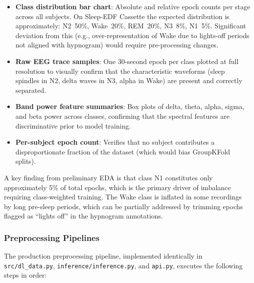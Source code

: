 \documentclass[10pt]{article}
\begin{document}
\begin{itemize}
  \item \textbf{Class distribution bar chart}: Absolute and relative epoch counts per stage across all subjects. On Sleep-EDF Cassette the expected distribution is approximately: N2~50\%, Wake~20\%, REM~20\%, N3~8\%, N1~5\%. Significant deviation from this (e.g., over-representation of Wake due to lights-off periods not aligned with hypnogram) would require pre-processing changes.
  \item \textbf{Raw EEG trace samples}: One 30-second epoch per class plotted at full resolution to visually confirm that the characteristic waveforms (sleep spindles in N2, delta waves in N3, alpha in Wake) are present and correctly separated.
  \item \textbf{Band power feature summaries}: Box plots of delta, theta, alpha, sigma, and beta power across classes, confirming that the spectral features are discriminative prior to model training.
  \item \textbf{Per-subject epoch count}: Verifies that no subject contributes a disproportionate fraction of the dataset (which would bias GroupKFold splits).
\end{itemize}

A key finding from preliminary EDA is that class N1 constitutes only approximately 5\% of total epochs, which is the primary driver of imbalance requiring class-weighted training. The Wake class is inflated in some recordings by long pre-sleep periods, which can be partially addressed by trimming epochs flagged as ``lights off'' in the hypnogram annotations.

\subsubsection{Preprocessing Pipelines}
\label{sec:preprocessingPipelines}

The production preprocessing pipeline, implemented identically in \texttt{src/dl\_data.py}, \texttt{inference/inference.py}, and \texttt{api.py}, executes the following steps in order:
\end{document}
